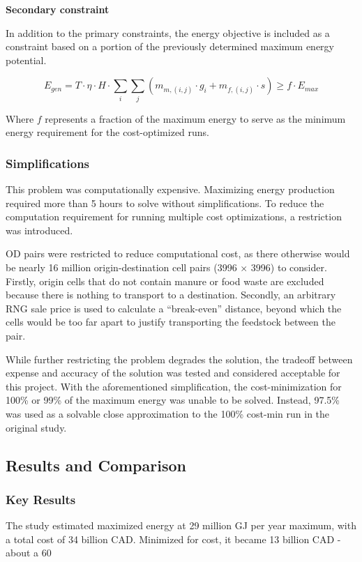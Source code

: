 \documentclass[12pt]{article}
\begin{document}
\vspace{10pt}
\textbf{Secondary constraint}

In addition to the primary constraints, the energy objective is included as a constraint based on a portion of the previously determined maximum energy potential.

\begin{equation}
  E_{gen} = T \cdot \eta \cdot H \cdot \sum_{i}\sum_{j}(m_{m, (i, j)} \cdot g_i + m_{f, (i, j)} \cdot s) \geq f \cdot E_{max} 
\end{equation}

Where $f$ represents a fraction of the maximum energy to serve as the minimum energy requirement for the cost-optimized runs.

\subsubsection{Simplifications}
This problem was computationally expensive. Maximizing energy production required more than 5 hours to solve without simplifications. To reduce the computation requirement for running multiple cost optimizations, a restriction was introduced.

OD pairs were restricted to reduce computational cost, as there otherwise would be nearly 16 million origin-destination cell pairs (3996 $\times$ 3996) to consider. Firstly, origin cells that do not contain manure or food waste are excluded because there is nothing to transport to a destination. Secondly, an arbitrary RNG sale price is used to calculate a “break-even” distance, beyond which the cells would be too far apart to justify transporting the feedstock between the pair. 

While further restricting the problem degrades the solution, the tradeoff between expense and accuracy of the solution was tested and considered acceptable for this project. With the aforementioned simplification, the cost-minimization for 100\% or 99\% of the maximum energy was unable to be solved. Instead, 97.5\% was used as a solvable close approximation to the 100\% cost-min run in the original study. 


\subsection{Results and Comparison}

\subsubsection{Key Results}
The study estimated maximized energy at 29 million GJ per year maximum, with a total cost of 34 billion CAD. Minimized for cost, it became 13 billion CAD - about a 60%
\end{document}
